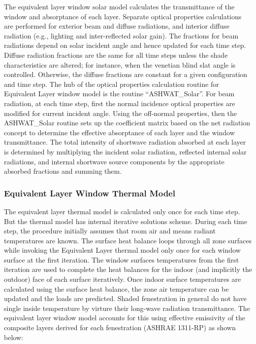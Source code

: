 {The equivalent layer window solar model calculates the transmittance of the window and absorptance of each layer. Separate optical properties calculations are performed for exterior beam and diffuse radiations, and interior diffuse radiation (e.g., lighting and inter-reflected solar gain). The fractions for beam radiations depend on solar incident angle and hence updated for each time step. Diffuse radiation fractions are the same for all time steps unless the shade characteristics are altered; for instance, when the venetian blind slat angle is controlled. Otherwise, the diffuse fractions are constant for a given configuration and time step. The hub of the optical properties calculation routine for Equivalent Layer window model is the routine ``ASHWAT\_Solar''. For beam radiation, at each time step, first the normal incidence optical properties are modified for current incident angle. Using the off-normal properties, then the ASHWAT\_Solar routine sets up the coefficient matrix based on the net radiation concept to determine the effective absorptance of each layer and the window transmittance. The total intensity of shortwave radiation absorbed at each layer is determined by multiplying the incident solar radiation, reflected internal solar radiations, and internal shortwave source components by the appropriate absorbed fractions and summing them.

\subsubsection{Equivalent Layer Window Thermal Model}\label{equivalent-layer-window-thermal-model}

The equivalent layer thermal model is calculated only once for each time step. But the thermal model has internal iterative solutions scheme. During each time step, the procedure initially assumes that room air and means radiant temperatures are known. The surface heat balance loops through all zone surfaces while invoking the Equivalent Layer thermal model only once for each window surface at the first iteration. The window surfaces temperatures from the first iteration are used to complete the heat balances for the indoor (and implicitly the outdoor) face of each surface iteratively. Once indoor surface temperatures are calculated using the surface heat balance, the zone air temperature can be updated and the loads are predicted. Shaded fenestration in general do not have single inside temperature by virture their long-wave radiation transmittance. The equivalent layer window model accounts for this using effective emissivity of the composite layers derived for each fenestration (ASHRAE 1311-RP) as shown below:

}
